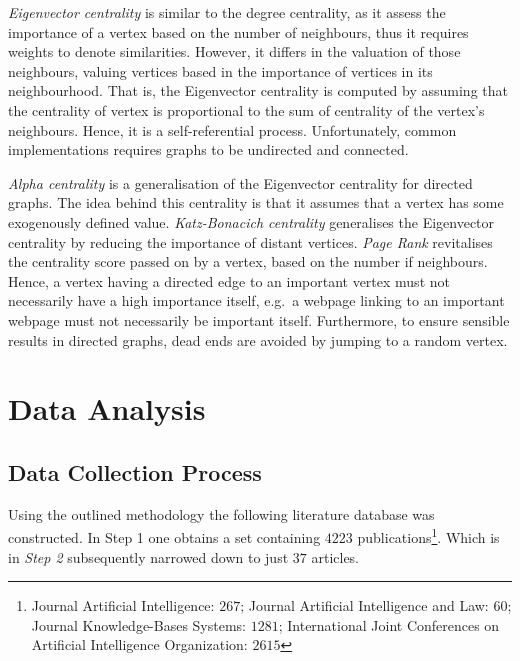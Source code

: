 \documentclass[11pt,a4paper]{book}
\theoremstyle{definition}
\theoremstyle{definition}
\theoremstyle{definition}
\theoremstyle{remark}
\begin{document}
\emph{Eigenvector centrality} is similar to the degree centrality, as it assess the importance of a vertex based on the number of neighbours, thus it requires weights to denote similarities. However, it differs in the valuation of those neighbours, valuing vertices based in the importance of vertices in its neighbourhood. That is, the Eigenvector centrality is computed by assuming that the centrality of vertex is proportional to the sum of centrality of the vertex's neighbours. Hence, it is a self-referential process. Unfortunately, common implementations requires graphs to be undirected and connected. 
\medskip


 \emph{Alpha centrality} is a generalisation of the Eigenvector centrality for directed graphs. The idea behind this centrality is that it assumes that a vertex has some exogenously defined value. \emph{Katz-Bonacich centrality} generalises the Eigenvector centrality by reducing the importance of distant vertices. 
\emph{Page Rank} revitalises the centrality score passed on by a vertex, based on the number if neighbours. Hence, a vertex having a directed edge to an important vertex must not necessarily have a high importance itself, e.g.\ a webpage linking to an important webpage must not necessarily be important itself. Furthermore, to ensure sensible results in directed graphs, dead ends are avoided by jumping to a random vertex.





\section{Data Analysis}



\subsection{Data Collection Process}

Using the outlined methodology the following literature database was constructed. 
In Step 1 one obtains a set containing $4223$ publications\footnote{Journal Artificial Intelligence: $267$; Journal Artificial Intelligence and Law:  $60$; Journal Knowledge-Bases Systems: $1281$; International Joint Conferences on Artificial Intelligence Organization: $2615$}. 
Which is in \emph{Step 2} subsequently narrowed down to just $37$ articles\parencite{van2019separators,verheij2017proof,chen2019judicial,neil2019modelling,li2019context,lu2018mining,zhang2018collective,
constantinou2017towards,liang2017evaluation,zhang2017characterizing,mu2018measuring,kronegger2019backdoors,hyttinen2017core,
zhang2017transfer,zhang2017causal,liu2017cause,summerville2017charda,zhang2016causal,albrecht2016exploiting,chai2018language,
bochman2018actual,ibeling2018conditional,laurent2018counterfactual,chikahara2018causal,zhang2017achieving,backstrom2018novel,
jaber2018graphical,sridhar2018scalable,wenjuan2018mixed,xu2019achieving,zhang2019asp,Cai2019CausalDW,Sridhar2019EstimatingCE,
xie2019boosting,hassanzadeh2019answering,shankar2019three,Liepina2019ArguingAC}.
\end{document}
